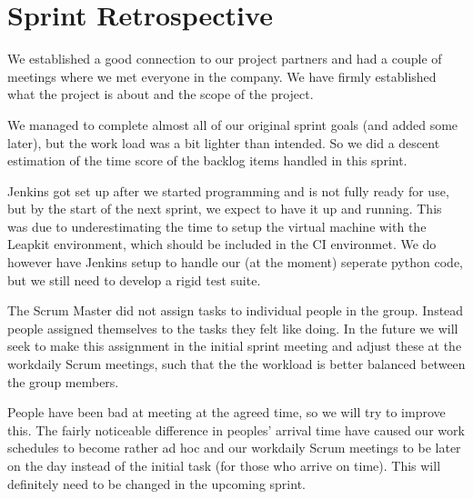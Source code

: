\section{Sprint Retrospective}

We established a good connection to our project partners and had a
couple of meetings where we met everyone in the company. We have firmly
established what the project is about and the scope of the project.

We managed to complete almost all of our original sprint goals (and added some later), but the work load was a bit lighter than intended. So we did a descent estimation of the time score of the backlog items handled in this sprint.

Jenkins got set up after we started programming and is not fully ready for use, but by the start of the next sprint, we expect to have it up and running. This was due to underestimating the time to setup the virtual machine with the Leapkit environment, which should be included in the CI environmet. We do however have Jenkins setup to handle our (at the moment) seperate python code, but we still need to develop a rigid test suite.

The Scrum Master did not assign tasks to individual people in the
group. Instead people assigned themselves to the tasks they felt like
doing. In the future we will seek to make this assignment in the
initial sprint meeting and adjust these at the workdaily Scrum meetings,
such that the the workload is better balanced between the group members.

People have been bad at meeting at the agreed time, so we will try to improve this. The fairly noticeable difference in peoples' arrival time have caused our work schedules to become rather ad hoc and our workdaily Scrum meetings to be later on the day instead of the initial task (for those who arrive on time). This will definitely need to be changed in the upcoming sprint.
